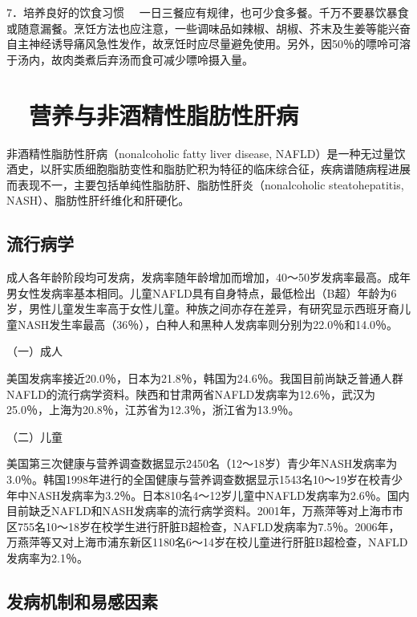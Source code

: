 {7．培养良好的饮食习惯}
　一日三餐应有规律，也可少食多餐。千万不要暴饮暴食或随意漏餐。烹饪方法也应注意，一些调味品如辣椒、胡椒、芥末及生姜等能兴奋自主神经诱导痛风急性发作，故烹饪时应尽量避免使用。另外，因50％的嘌呤可溶于汤内，故肉类煮后弃汤而食可减少嘌呤摄入量。

\hypertarget{text00004.htmlux5cux23mllj28}{%
\section{　营养与非酒精性脂肪性肝病}\label{text00004.htmlux5cux23mllj28}}

非酒精性脂肪性肝病（nonalcoholic fatty liver disease,
NAFLD）是一种无过量饮酒史，以肝实质细胞脂肪变性和脂肪贮积为特征的临床综合征，疾病谱随病程进展而表现不一，主要包括单纯性脂肪肝、脂肪性肝炎（nonalcoholic
steatohepatitis, NASH）、脂肪性肝纤维化和肝硬化。

\hypertarget{text00004.htmlux5cux23mllj29}{%
\subsection{流行病学}\label{text00004.htmlux5cux23mllj29}}

成人各年龄阶段均可发病，发病率随年龄增加而增加，40～50岁发病率最高。成年男女性发病率基本相同。儿童NAFLD具有自身特点，最低检出（B超）年龄为6岁，男性儿童发生率高于女性儿童。种族之间亦存在差异，有研究显示西班牙裔儿童NASH发生率最高（36％），白种人和黑种人发病率则分别为22.0％和14.0％。

（一）成人

美国发病率接近20.0％，日本为21.8％，韩国为24.6％。我国目前尚缺乏普通人群NAFLD的流行病学资料。陕西和甘肃两省NAFLD发病率为12.6％，武汉为25.0％，上海为20.8％，江苏省为12.3％，浙江省为13.9％。

（二）儿童

美国第三次健康与营养调查数据显示2450名（12～18岁）青少年NASH发病率为3.0％。韩国1998年进行的全国健康与营养调查数据显示1543名10～19岁在校青少年中NASH发病率为3.2％。日本810名4～12岁儿童中NAFLD发病率为2.6％。国内目前缺乏NAFLD和NASH发病率的流行病学资料。2001年，万燕萍等对上海市市区755名10～18岁在校学生进行肝脏B超检查，NAFLD发病率为7.5％。2006年，万燕萍等又对上海市浦东新区1180名6～14岁在校儿童进行肝脏B超检查，NAFLD发病率为2.1％。

\hypertarget{text00004.htmlux5cux23mllj30}{%
\subsection{发病机制和易感因素}\label{text00004.htmlux5cux23mllj30}}

